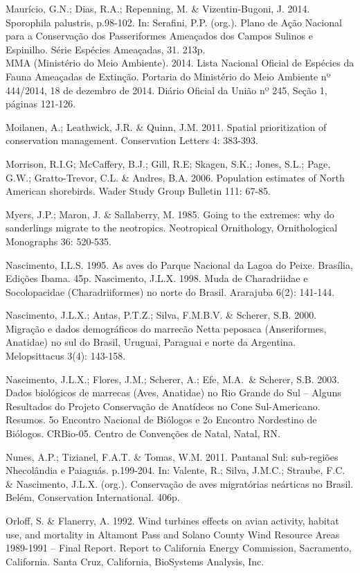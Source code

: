 \documentclass[
]{scrbook}
\begin{document}
Maurício, G.N.; Dias, R.A.; Repenning, M. \& Vizentin-Bugoni, J. 2014. Sporophila palustris, p.98-102. In: Serafini, P.P. (org.). Plano de Ação Nacional para a Conservação dos Passeriformes Ameaçados dos Campos Sulinos e Espinilho. Série Espécies Ameaçadas, 31. 213p.\\
MMA (Ministério do Meio Ambiente). 2014. Lista Nacional Oficial de Espécies da Fauna Ameaçadas de Extinção. Portaria do Ministério do Meio Ambiente nº 444/2014, 18 de dezembro de 2014. Diário Oficial da União nº 245, Seção 1, páginas 121-126.

Moilanen, A.; Leathwick, J.R. \& Quinn, J.M. 2011. Spatial prioritization of conservation management. Conservation Letters 4: 383-393.

Morrison, R.I.G; McCaffery, B.J.; Gill, R.E; Skagen, S.K.; Jones, S.L.; Page, G.W.; Gratto-Trevor, C.L. \& Andres, B.A. 2006. Population estimates of North American shorebirds. Wader Study Group Bulletin 111: 67-85.

Myers, J.P.; Maron, J. \& Sallaberry, M. 1985. Going to the extremes: why do sanderlings migrate to the neotropics. Neotropical Ornithology, Ornithological Monographs 36: 520-535.

Nascimento, I.L.S. 1995. As aves do Parque Nacional da Lagoa do Peixe. Brasília, Edições Ibama. 45p.
Nascimento, J.L.X. 1998. Muda de Charadriidae e Socolopacidae (Charadriiformes) no norte do Brasil. Ararajuba 6(2): 141-144.

Nascimento, J.L.X.; Antas, P.T.Z.; Silva, F.M.B.V. \& Scherer, S.B. 2000. Migração e dados demográficos do marrecão Netta peposaca (Anseriformes, Anatidae) no sul do Brasil, Uruguai, Paraguai e norte da Argentina. Melopsittacus 3(4): 143-158.

Nascimento, J.L.X.; Flores, J.M.; Scherer, A.; Efe, M.A.~\& Scherer, S.B. 2003. Dados biológicos de marrecas (Aves, Anatidae) no Rio Grande do Sul -- Alguns Resultados do Projeto Conservação de Anatídeos no Cone Sul-Americano. Resumos. 5o Encontro Nacional de Biólogos e 2o Encontro Nordestino de Biólogos. CRBio-05. Centro de Convenções de Natal, Natal, RN.

Nunes, A.P.; Tizianel, F.A.T. \& Tomas, W.M. 2011. Pantanal Sul: sub-regiões Nhecolândia e Paiaguás. p.199-204. In: Valente, R.; Silva, J.M.C.; Straube, F.C. \& Nascimento, J.L.X. (org.). Conservação de aves migratórias neárticas no Brasil. Belém, Conservation International. 406p.

Orloff, S. \& Flanerry, A. 1992. Wind turbines effects on avian activity, habitat use, and mortality in Altamont Pass and Solano County Wind Resource Areas 1989-1991 -- Final Report. Report to California Energy Commission, Sacramento, California. Santa Cruz, California, BioSystems Analysis, Inc.~
\end{document}
